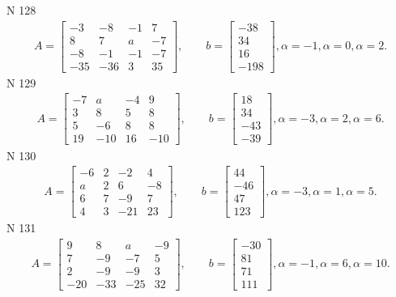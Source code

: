 \documentclass[11pt]{report}
\begin{document}
N 128
\begin{align*}
 A = \left[\begin{matrix}-3 & -8 & -1 & 7\\8 & 7 & a & -7\\-8 & -1 & -1 & -7\\-35 & -36 & 3 & 35\end{matrix}\right],
    \qquad b = \left[\begin{matrix}-38\\34\\16\\-198\end{matrix}\right], \alpha = -1, \alpha = 0, \alpha = 2. 
 \end{align*}
N 129
\begin{align*}
 A = \left[\begin{matrix}-7 & a & -4 & 9\\3 & 8 & 5 & 8\\5 & -6 & 8 & 8\\19 & -10 & 16 & -10\end{matrix}\right],
    \qquad b = \left[\begin{matrix}18\\34\\-43\\-39\end{matrix}\right], \alpha = -3, \alpha = 2, \alpha = 6. 
 \end{align*}
N 130
\begin{align*}
 A = \left[\begin{matrix}-6 & 2 & -2 & 4\\a & 2 & 6 & -8\\6 & 7 & -9 & 7\\4 & 3 & -21 & 23\end{matrix}\right],
    \qquad b = \left[\begin{matrix}44\\-46\\47\\123\end{matrix}\right], \alpha = -3, \alpha = 1, \alpha = 5. 
 \end{align*}
N 131
\begin{align*}
 A = \left[\begin{matrix}9 & 8 & a & -9\\7 & -9 & -7 & 5\\2 & -9 & -9 & 3\\-20 & -33 & -25 & 32\end{matrix}\right],
    \qquad b = \left[\begin{matrix}-30\\81\\71\\111\end{matrix}\right], \alpha = -1, \alpha = 6, \alpha = 10. 
 \end{align*}
\end{document}
